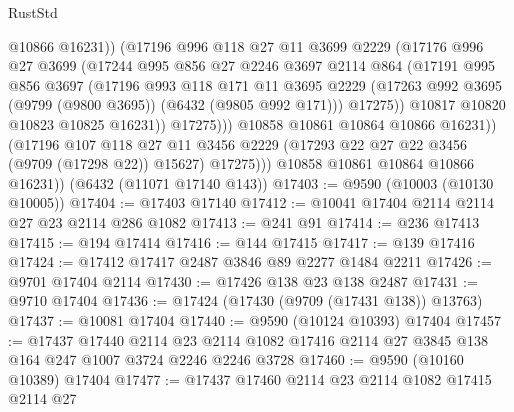 \begin{lexlean}{RustStd}
\begin{coremodule}
                        @10866
                        @16231))
                    (@17196
                      @996
                      @118
                      @27
                      @11
                      @3699
                      @2229
                      (@17176
                        @996
                        @27
                        @3699
                        (@17244
                          @995
                          @856
                          @27
                          @2246
                          @3697
                          @2114
                          @864
                          (@17191
                            @995
                            @856
                            @3697
                            (@17196
                              @993
                              @118
                              @171
                              @11
                              @3695
                              @2229
                              (@17263 @992 @3695 (@9799 (@9800 @3695)) (@6432 (@9805 @992 @171)))
                              @17275))
                          @10817
                          @10820
                          @10823
                          @10825
                          @16231))
                      @17275)))
                @10858
                @10861
                @10864
                @10866
                @16231))
            (@17196
              @107
              @118
              @27
              @11
              @3456
              @2229
              (@17293 @22 @27 @22 @3456 (@9709 (@17298 @22)) @15627)
              @17275)))
        @10858
        @10861
        @10864
        @10866
        @16231))
    (@6432 (@11071 @17140 @143))
@17403 := @9590 (@10003 (@10130 @10005))
@17404 := @17403 @17140
@17412 := @10041 @17404 @2114 @2114 @27 @23 @2114 @286 @1082
@17413 := @241 @91
@17414 := @236 @17413
@17415 := @194 @17414
@17416 := @144 @17415
@17417 := @139 @17416
@17424 := @17412 @17417 @2487 @3846 @89 @2277 @1484 @2211
@17426 := @9701 @17404 @2114
@17430 := @17426 @138 @23 @138 @2487
@17431 := @9710 @17404
@17436 := @17424 (@17430 (@9709 (@17431 @138)) @13763)
@17437 := @10081 @17404
@17440 := @9590 (@10124 @10393) @17404
@17457 := @17437
    @17440
    @2114
    @23
    @2114
    @1082
    @17416
    @2114
    @27
    @3845
    @138
    @164
    @247
    @1007
    @3724
    @2246
    @2246
    @3728
@17460 := @9590 (@10160 @10389) @17404
@17477 := @17437
    @17460
    @2114
    @23
    @2114
    @1082
    @17415
    @2114
    @27

\end{coremodule}
\end{lexlean}

